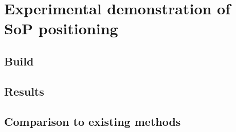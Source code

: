 \chapter{Experimental demonstration of SoP positioning}
\section{Build}

\section{Results}

\section{Comparison to existing methods}
